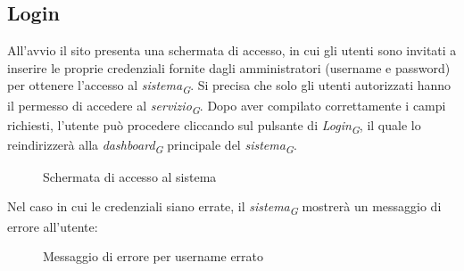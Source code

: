 \subsection{Login}

All'avvio il sito presenta una schermata di accesso, in cui gli utenti sono invitati a inserire le proprie credenziali fornite dagli amministratori (username e password) per ottenere l'accesso al \textit{sistema}\textsubscript{\textit{G}}. Si precisa che solo gli utenti autorizzati hanno il permesso di accedere al \textit{servizio}\textsubscript{\textit{G}}. Dopo aver compilato correttamente i campi richiesti, l'utente può procedere cliccando sul pulsante di \textit{Login}\textsubscript{\textit{G}}, il quale lo reindirizzerà alla \textit{dashboard}\textsubscript{\textit{G}} principale del \textit{sistema}\textsubscript{\textit{G}}. \\
\begin{figure}[H]
    \centering
    \caption{Schermata di accesso al sistema}
    \label{fig:my_label}
\end{figure}
Nel caso in cui le credenziali siano errate, il \textit{sistema}\textsubscript{\textit{G}} mostrerà un messaggio di errore all’utente:\\
\begin{figure}[H]
    \centering
    \caption{Messaggio di errore per username errato}
    \label{fig:my_label}
\end{figure} 